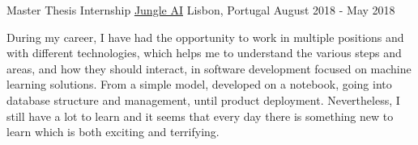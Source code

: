 \begin{cventries}
  \cventry
    {Master Thesis Internship} %
    {\href{https://www.jungle.ai}{Jungle AI}} %
    {Lisbon, Portugal} %
    {August 2018 - May 2018} %
    {
      \begin{cvitems} %
        \item {During my career, I have had the opportunity to work in multiple positions and with different technologies, which helps me to understand the various steps and areas, and how they should interact, in software development focused on machine learning solutions. From a simple model, developed on a notebook, going into database structure and management, until product deployment. Nevertheless, I still have a lot to learn and it seems that every day there is something new to learn which is both exciting and terrifying.}
      \end{cvitems}
    }
\end{cventries}
